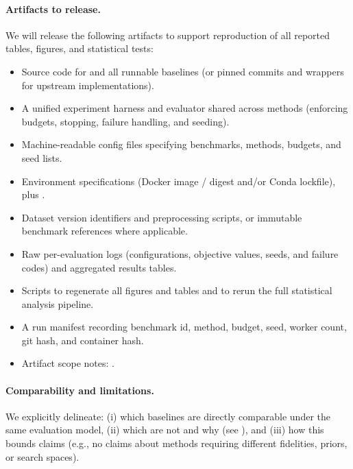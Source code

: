 \paragraph{Artifacts to release.}
We will release the following artifacts to support reproduction of all reported tables, figures, and statistical tests:
\begin{itemize}
    \item Source code for \ProposedMethodName{} and all runnable baselines (or pinned commits and wrappers for upstream implementations).
    \item A unified experiment harness and evaluator shared across methods (enforcing budgets, stopping, failure handling, and seeding).
    \item Machine-readable config files specifying benchmarks, methods, budgets, and seed lists.
    \item Environment specifications (Docker image / digest and/or Conda lockfile), plus \SoftwareVersions{}.
    \item Dataset version identifiers and preprocessing scripts, or immutable benchmark references where applicable.
    \item Raw per-evaluation logs (configurations, objective values, seeds, and failure codes) and aggregated results tables.
    \item Scripts to regenerate all figures and tables and to rerun the full statistical analysis pipeline.
    \item A run manifest recording benchmark id, method, budget, seed, worker count, git hash, and container hash.
    \item Artifact scope notes: \ArtifactReleaseScope{}.
\end{itemize}

\paragraph{Comparability and limitations.}
We explicitly delineate:
(i) which baselines are directly comparable under the same evaluation model,
(ii) which are not and why (see \BaselinesNotRunWhy{}),
and (iii) how this bounds claims (e.g., no claims about methods requiring different fidelities, priors, or search spaces).
